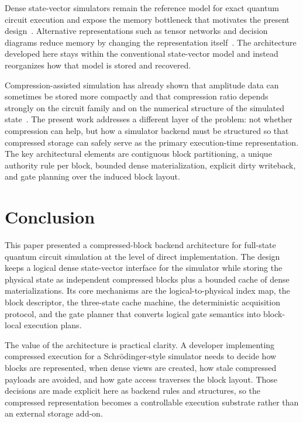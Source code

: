 \documentclass[runningheads]{llncs}
\begin{document}
Dense state-vector simulators remain the reference model for exact quantum circuit execution and expose the memory bottleneck that motivates the present design~\cite{Jones2019,Steiger2018,Haner2017,diaz2024software,diaz_mdpi_mmss}. Alternative representations such as tensor networks and decision diagrams reduce memory by changing the representation itself~\cite{Vidal2003,Markov2008,Vinkhuijzen2023}. The architecture developed here stays within the conventional state-vector model and instead reorganizes how that model is stored and recovered.

Compression-assisted simulation has already shown that amplitude data can sometimes be stored more compactly and that compression ratio depends strongly on the circuit family and on the numerical structure of the simulated state~\cite{wu2018amplitude,wu2019full,Zhang2025BMQSim}. The present work addresses a different layer of the problem: not whether compression can help, but how a simulator backend must be structured so that compressed storage can safely serve as the primary execution-time representation. The key architectural elements are contiguous block partitioning, a unique authority rule per block, bounded dense materialization, explicit dirty writeback, and gate planning over the induced block layout.

\section{Conclusion}

This paper presented a compressed-block backend architecture for full-state quantum circuit simulation at the level of direct implementation. The design keeps a logical dense state-vector interface for the simulator while storing the physical state as independent compressed blocks plus a bounded cache of dense materializations. Its core mechanisms are the logical-to-physical index map, the block descriptor, the three-state cache machine, the deterministic acquisition protocol, and the gate planner that converts logical gate semantics into block-local execution plans.

The value of the architecture is practical clarity. A developer implementing compressed execution for a Schr\"odinger-style simulator needs to decide how blocks are represented, when dense views are created, how stale compressed payloads are avoided, and how gate access traverses the block layout. Those decisions are made explicit here as backend rules and structures, so the compressed representation becomes a controllable execution substrate rather than an external storage add-on.
\end{document}
